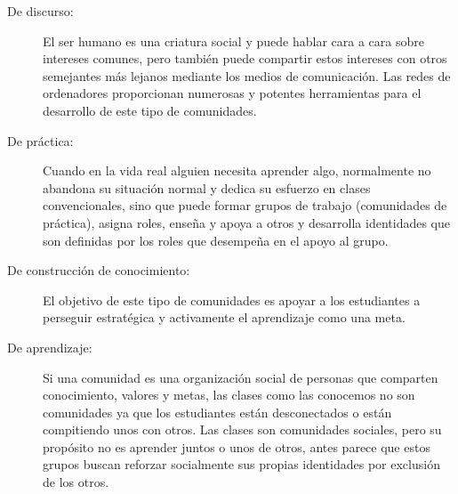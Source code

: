 \begin{description}
\item [De discurso:] El ser humano es una criatura social y puede hablar cara a cara sobre intereses comunes, pero también puede compartir estos intereses con otros semejantes más lejanos mediante los medios de comunicación. Las redes de ordenadores proporcionan numerosas y potentes herramientas para el desarrollo de este tipo de comunidades.

\item [De práctica:] Cuando en la vida real alguien necesita aprender algo, normalmente no abandona su situación normal y dedica su esfuerzo en clases convencionales, sino que puede formar grupos de trabajo (comunidades de práctica), asigna roles, enseña y apoya a otros y desarrolla identidades que son definidas por los roles que desempeña en el apoyo al grupo.

\item [De construcción de conocimiento:] El objetivo de este tipo de comunidades es apoyar a los estudiantes a perseguir estratégica y activamente el aprendizaje como una meta.

\item [De aprendizaje:] Si una comunidad es una organización social de personas que comparten conocimiento, valores y metas, las clases como las conocemos no son comunidades ya que los estudiantes están desconectados o están compitiendo unos con otros. Las clases son comunidades sociales, pero su propósito no es aprender juntos o unos de otros, antes parece que estos grupos buscan reforzar socialmente sus propias identidades por exclusión de los otros.

\end{description}

